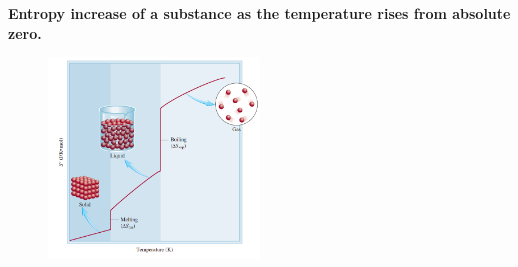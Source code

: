 \documentclass[a4paper,12pt,twocolumn]{article}
\begin{document}
\textbf{Entropy increase of a substance as the temperature rises from absolute zero.}
\begin{figure}[h]
\centering
\includegraphics[width=0.5\textwidth]{Screenshot 2023-03-27 004224.png}
\end{figure}
\end{document}
